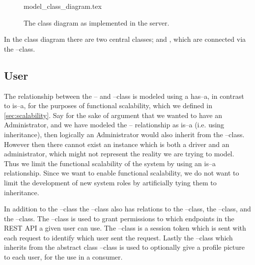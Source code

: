 \begin{figure}[p]
    \begin{center}
        {model_class_diagram.tex}
        \caption{The class diagram as implemented in the server.}\label{fig:model_class_diagram}
    \end{center}
\end{figure}

In the class diagram there are two central classes;  and , which are connected via the --class.
\subsection{User}
The relationship between the -- and --class is modeled using a has--a, in contrast to is--a, for the purposes of functional scalability, which we defined in \cref{sec:scalability}.
Say for the sake of argument that we wanted to have an Administrator, and we have modeled the -- relationship as is--a (i.e. using inheritance), 
then logically an Administrator would also inherit from the --class.
However then there cannot exist an instance which is both a driver and an administrator, which might not represent the reality we are trying to model. 
Thus we limit the functional scalability of the system by using an is--a relationship. 
Since we want to enable functional scalability, we do not want to limit the development of new system roles by artificially tying them to inheritance.

In addition to the --class the --class also has relations to the --class, the --class, and the --class.
The --class is used to grant permissions to which endpoints in the REST API a given user can use. 
The --class is a session token which is sent with each request to identify which user sent the request. 
Lastly the --class which inherits from the abstract class --class is used to optionally give a profile picture to each user, for the use in a consumer. 

